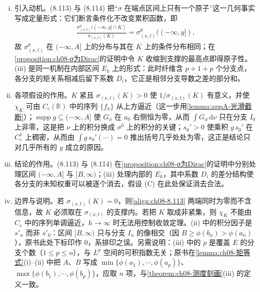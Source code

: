 \documentclass[../../main.tex]{subfiles}%
\begin{document}
\begin{remark}\label{remark:ch08-矩等式}
\begin{enumerate}[(i)]
\item 引入动机。(8.113) 与 (8.114) 把“$\sigma$ 在端点区间上只有一个原子”这一几何事实写成定量形式：它们断言条件化不改变累积函数，即
\begin{align*}
\frac{\sigma^0_{(x,t)}((-\infty,y]\cap K)}{\sigma_{(x,t)}(K)}=\sigma^0_{(x,t)}((-\infty,y]),
\end{align*}
故 $\sigma^0_{(x,t)}$ 在 $(-\infty,A]$ 上的分布与其在 $K$ 上的条件分布相同；在\cref{proposition:ch08-σ为Dirac}的证明中令 $K$ 收缩到支撑的最高点即得原子性。(iii) 是同一机制在内部区间 $E_k$ 上的形式：此时纤维含 $p+1+p$ 个分支点，各分支的矩关系相减后留下系数 $D_i$，它正是相邻分支导数之差的部分和。
\item 各项假设的作用。$K$ 紧且 $\sigma_{(x,t)}(K)>0$ 使 $1/\sigma_{(x,t)}(K)$ 有意义，并使 $\chi_K$ 可由 $C_c(\mathbb{R})$ 中的序列 $\{f_h\}$ 从上方逼近（这一步用\cref{lemma:appA-光滑截断}）；$\operatorname{supp}g\subseteq(-\infty,A]$ 使 $G_\phi$ 在 $a_0$ 右侧恒为零，从而 $\int G_\phi\,\mathrm{d}\nu$ 只在分支 $I_0$ 上非零，这是把 $\nu$ 上的积分换成 $\sigma^0$ 上的积分的关键；$s_0'>0$ 使乘积 $g\,s_0'$ 在 $C_c^1$ 上稠密，从而由 $\int g\,s_0'(\cdots)=0$ 推出括号几乎处处为零，这正是结论只对几乎所有的 $y$ 成立的原因。
\item 结论的作用。(8.113) 与 (8.114) 在\cref{proposition:ch08-σ为Dirac}的证明中分别处理区间 $(-\infty,A]$ 与 $[B,\infty)$；(iii) 处理内部的 $E_k$，其中系数 $D_i$ 的差分结构使各分支的未知权重可以被逐个消去，假设 (C) 在此处保证消去合法。
\item 边界与说明。若 $\sigma_{(x,t)}(K)=0$，则\eqref{align:ch08-8.113} 两端同时为零而不含信息，故 $K$ 必须取在 $\sigma_{(x,t)}$ 的支撑内。若把 $K$ 取成非紧集，则 $\chi_K$ 不能由 $C_c$ 中的序列单调逼近，$h\to\infty$ 时无法用控制收敛定理。(ii) 中的积分因子是 $s'_n$ 而非 $s'_0$：区间 $[B,\infty)$ 只与分支 $I_n$ 的像相交（因 $B\geqslant\phi(b_n)>\phi(a_n)$），原书此处下标印作 $0$，系排印之误。另需说明：(iii) 中的 $p$ 是覆盖 $E$ 的分支个数（$1\leqslant p\leqslant n$），与 $L^p$ 空间的可积指数无关；原书在\cref{lemma:ch08-矩等式}(i)--(ii) 中把 $A$、$B$ 写成 $\min\{\phi(a_1),\cdots ,\phi(a_p)\}$、$\max\{\phi(b_1),\cdots ,\phi(b_p)\}$，应取 $n$ 项，与\cref{theorem:ch08-测度刻画}(iii) 的定义一致。
\end{enumerate}
\end{remark}
\end{document}
